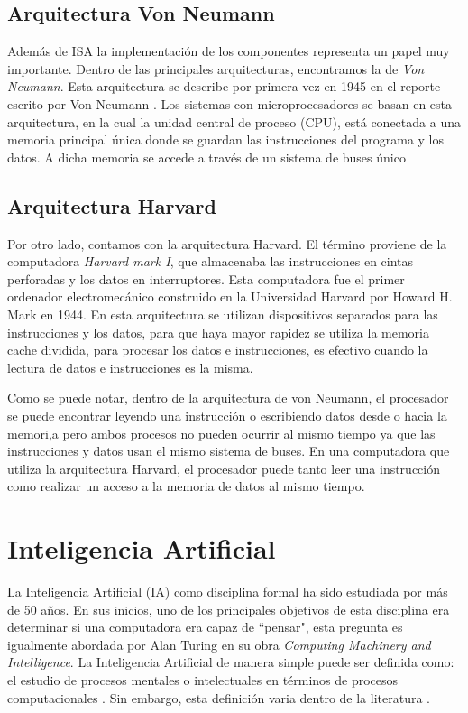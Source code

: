 \subsection{Arquitectura Von Neumann}

Adem\'{a}s de ISA la implementaci\'{o}n de los componentes representa un papel muy importante. Dentro de las principales arquitecturas, encontramos la de \emph{Von Neumann}. Esta arquitectura se describe por primera vez en 1945 en el reporte escrito por Von Neumann \cite{von1993first}. Los sistemas con microprocesadores se basan en esta arquitectura, en la cual la unidad central de proceso (CPU), está conectada a una memoria principal única donde se guardan las instrucciones del programa y los datos. A dicha memoria se accede a través de un sistema de buses único

\subsection{Arquitectura Harvard}

 Por otro lado, contamos con la arquitectura Harvard. El término proviene de la computadora \emph{Harvard mark I}, que almacenaba las instrucciones en cintas perforadas y los datos en interruptores. Esta computadora fue el primer ordenador electromecánico construido en la Universidad Harvard por Howard H. Mark en 1944. En esta arquitectura se utilizan dispositivos separados para las instrucciones y los datos, para  que haya mayor rapidez se utiliza la memoria cache dividida, para procesar los datos e instrucciones, es efectivo cuando la lectura de datos e instrucciones es la misma.
 
 Como se puede notar, dentro de la arquitectura de von Neumann, el procesador se puede encontrar leyendo una instrucción o escribiendo datos desde o hacia la memori,a pero ambos procesos no pueden ocurrir al mismo tiempo ya que las instrucciones y datos usan el mismo sistema de buses. En una computadora que utiliza la arquitectura Harvard, el procesador puede tanto leer una instrucción como realizar un acceso a la memoria de datos al mismo tiempo.

\section{Inteligencia Artificial}

La Inteligencia Artificial (IA) como disciplina formal  ha sido estudiada por más de 50 años. En sus inicios, uno de los principales objetivos de esta disciplina era determinar si una computadora era capaz de “pensar", esta pregunta es igualmente abordada por Alan Turing\cite{turing1950computing} en su obra \emph{Computing Machinery and Intelligence}. La Inteligencia Artificial de manera simple puede ser definida como: el estudio de procesos mentales o intelectuales en t\'{e}rminos de procesos computacionales \cite{aimodern}. Sin embargo, esta definici\'{o}n varia dentro de la literatura \cite{haugeland1985,bellman1978,winston1992learning}. 

